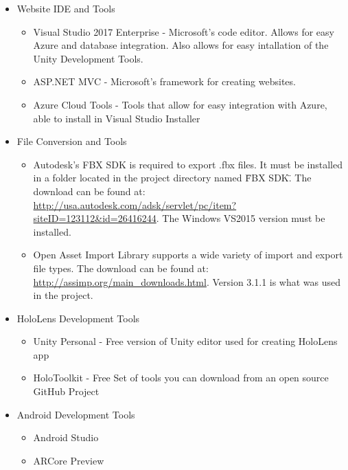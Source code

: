 \begin{itemize}

    \item Website IDE and Tools
    \begin{itemize}
        \item Visual Studio 2017 Enterprise - Microsoft's code editor. Allows for easy Azure and database
        integration. Also allows for easy intallation of the Unity Development Tools.
        \item ASP.NET MVC - Microsoft's framework for creating websites.
        \item Azure Cloud Tools - Tools that allow for easy integration with Azure, able to install in Visual Studio Installer
    \end{itemize}

    \item File Conversion and Tools
    \begin{itemize}
        \item Autodesk's FBX SDK is required to export .fbx files.  It must be installed in a folder located in the project directory named \"FBX SDK\".  The download can be found at: 
        \url{http://usa.autodesk.com/adsk/servlet/pc/item?siteID=123112&id=26416244}.
        The Windows VS2015 version must be installed.

        \item Open Asset Import Library supports a wide variety of import and export file types.  The download can be found at: \url{http://assimp.org/main_downloads.html}.  Version 3.1.1 is what was used in the project.         
    \end{itemize}

    \item HoloLens Development Tools
    \begin{itemize}
        \item Unity Personal - Free version of Unity editor used for creating HoloLens app

        \item HoloToolkit - Free Set of tools you can download from an open source GitHub Project

    \end{itemize}

    \item Android Development Tools
    \begin{itemize}
        \item Android Studio
        \item ARCore Preview
    \end{itemize}
\end{itemize}


